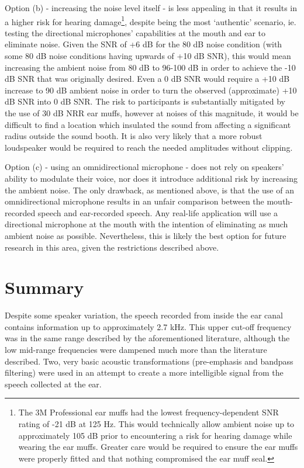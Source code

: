 Option (b) - increasing the noise level itself - is less appealing in that it results in a higher risk for hearing damage\footnote{The 3M Professional ear muffs had the lowest frequency-dependent SNR rating of -21 dB at 125 Hz.  This would technically allow ambient noise up to approximately 105 dB prior to encountering a risk for hearing damage while wearing the ear muffs.  Greater care would be required to ensure the ear muffs were properly fitted and that nothing compromised the ear muff seal.}, despite being the most `authentic' scenario, ie. testing the directional microphones' capabilities at the mouth and ear to eliminate noise.  Given the SNR of +6 dB for the 80 dB noise condition (with some 80 dB noise conditions having upwards of +10 dB SNR), this would mean increasing the ambient noise from 80 dB to 96-100 dB in order to achieve the -10 dB SNR that was originally desired.  Even a 0 dB SNR would require a +10 dB increase to 90 dB ambient noise in order to turn the observed (approximate) +10 dB SNR into 0 dB SNR. The risk to participants is substantially mitigated by the use of 30 dB NRR ear muffs, however at noises of this magnitude, it would be difficult to find a location which insulated the sound from affecting a significant radius outside the sound booth.  It is also very likely that a more robust loudspeaker would be required to reach the needed amplitudes without clipping.

Option (c) - using an omnidirectional microphone - does not rely on speakers' ability to modulate their voice, nor does it introduce additional risk by increasing the ambient noise.  The only drawback, as mentioned above, is that the use of an omnidirectional microphone results in an unfair comparison between the mouth-recorded speech and ear-recorded speech.  Any real-life application will use a directional microphone at the mouth with the intention of eliminating as much ambient noise as possible.  Nevertheless, this is likely the best option for future research in this area, given the restrictions described above.

\section{Summary}\label{chap2:summary}

Despite some speaker variation, the speech recorded from inside the ear canal contains information up to approximately 2.7 kHz.  This upper cut-off frequency was in the same range described by the aforementioned literature, although the low mid-range frequencies were dampened much more than the literature described.  Two, very basic acoustic transformations (pre-emphasis and bandpass filtering) were used in an attempt to create a more intelligible signal from the speech collected at the ear.


